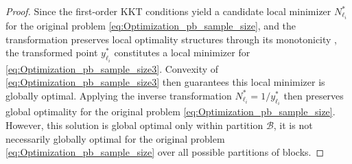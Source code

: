 \begin{proof}
Since the first-order KKT conditions yield a candidate local minimizer $N_{\ell_i}^*$ for the original problem \eqref{eq:Optimization_pb_sample_size}, and the transformation preserves local optimality structures through its monotonicity \cite{AgVeDiBo:2018}, the transformed point $y_{\ell_i}^*$ constitutes a local minimizer for \eqref{eq:Optimization_pb_sample_size3}. Convexity of \eqref{eq:Optimization_pb_sample_size3} then guarantees this local minimizer is globally optimal. Applying the inverse transformation $N_{\ell_i}^* = 1/y_{\ell_i}^*$ then preserves global optimality for the original problem \eqref{eq:Optimization_pb_sample_size}. However, this solution is global optimal only within partition $\mathscr{B}$, it is not necessarily globally optimal for the original problem \eqref{eq:Optimization_pb_sample_size} over all possible partitions of blocks.









\medskip
{}


\end{proof}

